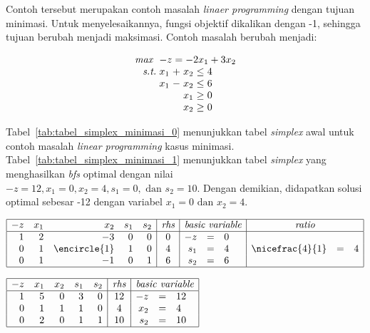 Contoh tersebut merupakan contoh masalah \textit{linaer programming} dengan tujuan minimasi. Untuk menyelesaikannya, fungsi objektif dikalikan dengan -1, sehingga tujuan berubah menjadi maksimasi. Contoh masalah berubah menjadi:

\begin{equation*}
	\setlength\arraycolsep{1.5pt}
	\begin{array}{r r c r c l}
		\textit{max } &\multicolumn{5}{l}{-z = -2x_1 + 3x_2}\\
		\textit{s.t.} &x_1 &+ &x_2 &\leq &4\\
		&x_1 &- &x_2 &\leq &6\\
		&&&x_1 &\geq &0\\
		&&&x_2 &\geq &0\\
	\end{array}
\end{equation*}

Tabel~\ref{tab:tabel_simplex_minimasi_0} menunjukkan tabel \textit{simplex} awal untuk contoh masalah \textit{linear programming} kasus minimasi. Tabel~\ref{tab:tabel_simplex_minimasi_1} menunjukkan tabel \textit{simplex} yang menghasilkan \textit{bfs} optimal dengan nilai \(-z=12, x_1=0, x_2=4, s_1=0, \text{ dan } s_2=10\). Dengan demikian, didapatkan solusi optimal sebesar -12 dengan variabel \(x_1=0 \text{ dan } x_2=4\).

\begin{center}
	\label{tab:tabel_simplex_minimasi_0}
	$
	\begin{array}{|r r r r r |c|r c l|r c l|}
		\hline
		-z & x_1 & x_2 & s_1 & s_2 & \textit{rhs} & \multicolumn{3}{c|}{\textit{basic variable}} & \multicolumn{3}{c|}{\textit{ratio}}\\
		\hline
		1 & 2 & -3 & 0 & 0 & 0 & -z & = & 0 &&&\\
		0 & 1 & \encircle{1} & 1 & 0 & 4 & s_1 & = & 4 & \nicefrac{4}{1} & = & 4\\
		0 & 1 & -1 & 0 & 1 & 6 & s_2 & = & 6 &&&\\
		\hline
	\end{array}
	$
\end{center}

\begin{center}
	\label{tab:tabel_simplex_minimasi_1}
	$
	\begin{array}{|r r r r r |c|r c l|}
		\hline
		-z & x_1 & x_2 & s_1 & s_2 & \textit{rhs} & \multicolumn{3}{c|}{\textit{basic variable}}\\
		\hline
		1 & 5 & 0 & 3 & 0 & 12 & -z & = & 12\\
		0 & 1 & 1 & 1 & 0 & 4 & x_2 & = & 4\\
		0 & 2 & 0 & 1 & 1 & 10 & s_2 & = & 10\\
		\hline
	\end{array}
	$
\end{center}

